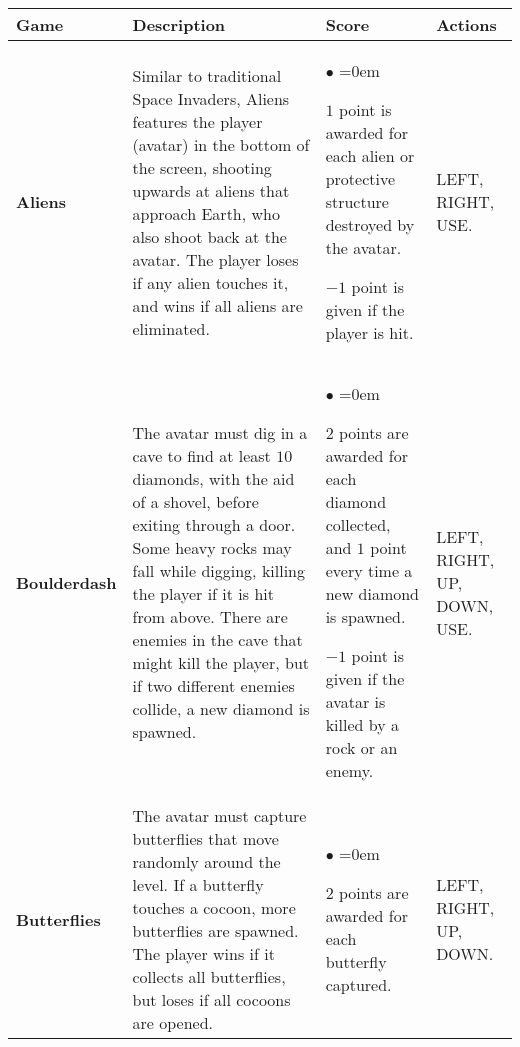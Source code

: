 \documentclass[conference]{IEEEtran}
\begin{document}


\begin{table*}[!t]
\begin{center}
\begin{tabular}{|m{1.4cm}|m{8cm}|m{5cm}|m{1cm}|}
\hline
\textbf{Game}  & \textbf{Description} & \textbf{Score} &  \textbf{Actions} \\ 
\hline
\textbf{Aliens} & Similar to traditional Space Invaders, Aliens features the player (avatar) in the bottom of the screen, shooting upwards at aliens that approach Earth, who also shoot back at the avatar. The player loses if any alien touches it, and wins if all aliens are eliminated. & \begin{list}{$\bullet$}{\leftmargin=2pt \itemindent=0em} \item $1$ point is awarded for each alien or protective structure destroyed by the avatar. \item $-1$ point is given if the player is hit. \end{list}  & LEFT, RIGHT, USE.\\
\hline
\textbf{Boulderdash} & The avatar must dig in a cave to find at least $10$ diamonds, with the aid of a shovel, before exiting through a door. Some heavy rocks may fall while digging, killing the player if it is hit from above. There are enemies in the cave that might kill the player, but if two different enemies collide, a new diamond is spawned.& \begin{list}{$\bullet$}{\leftmargin=2pt \itemindent=0em} \item $2$ points are awarded for each diamond collected, and $1$ point every time a new diamond is spawned. \item $-1$ point is given if the avatar is killed by a rock or an enemy. \end{list} & LEFT, RIGHT, UP, DOWN, USE.\\
\hline
\textbf{Butterflies} & The avatar must capture butterflies that move randomly around the level. If a butterfly touches a cocoon, more butterflies are spawned. The player wins if it collects all butterflies, but loses if all cocoons are opened. & \begin{list}{$\bullet$}{\leftmargin=2pt \itemindent=0em} \item $2$ points are awarded for each butterfly captured. \end{list} & LEFT, RIGHT, UP, DOWN.\\

\end{tabular}
\end{center}
\end{table*}
\end{document}
